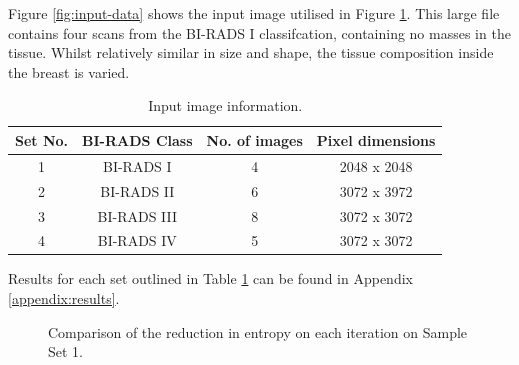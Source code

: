 Figure \ref{fig:input-data} shows the input image utilised in Figure \ref{fig:set1-results-all}. This large file contains four scans from the BI-RADS I classifcation, containing no masses in the tissue. Whilst relatively similar in size and shape, the tissue composition inside the breast is varied.

\begin{table}[H]
  \centering
  \begin{tabular}{|c|c|c|c|}
    \hline
      \textbf{Set No.} & \textbf{BI-RADS Class} & \textbf{No. of images} & \textbf{Pixel dimensions} \\ \hline
      1 & BI-RADS I & 4 & 2048 x 2048 \\ \hline
      2 & BI-RADS II & 6 & 3072 x 3972 \\ \hline
      3 & BI-RADS III & 8 & 3072 x 3072 \\ \hline
      4 & BI-RADS IV & 5 & 3072 x 3072 \\ \hline
  \end{tabular}
  \caption{Input image information.}
  \label{table:image-info}
\end{table}

Results for each set outlined in Table \ref{table:image-info} can be found in Appendix \ref{appendix:results}.

\begin{figure}[H]
  \begin{center}
    \caption{Comparison of the reduction in entropy on each iteration on Sample Set 1.}
    \label{fig:set1-results-all}
  \end{center}
\end{figure}

